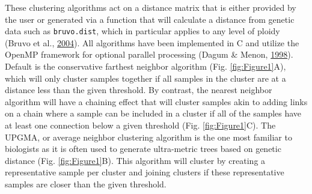 \documentclass[double,11pt]{beavtex}
\begin{document}
  These clustering algorithms act on a distance matrix that is either
  provided by the user or generated via a function that will calculate a
  distance from genetic data such as \texttt{bruvo.dist}, which in
  particular applies to any level of ploidy (Bruvo et al.,
  \protect\hyperlink{ref-bruvo2004simple}{2004}). All algorithms have been
  implemented in C and utilize the OpenMP framework for optional parallel
  processing (Dagum \& Menon,
  \protect\hyperlink{ref-dagum1998openmp}{1998}). Default is the
  conservative farthest neighbor algorithm (Fig. \ref{fig:Figure1}A),
  which will only cluster samples together if all samples in the cluster
  are at a distance less than the given threshold. By contrast, the
  nearest neighbor algorithm will have a chaining effect that will cluster
  samples akin to adding links on a chain where a sample can be included
  in a cluster if all of the samples have at least one connection below a
  given threshold (Fig. \ref{fig:Figure1}C). The UPGMA, or average
  neighbor clustering algorithm is the one most familiar to biologists as
  it is often used to generate ultra-metric trees based on genetic
  distance (Fig. \ref{fig:Figure1}B). This algorithm will cluster by
  creating a representative sample per cluster and joining clusters if
  these representative samples are closer than the given threshold.
  
\end{document}
